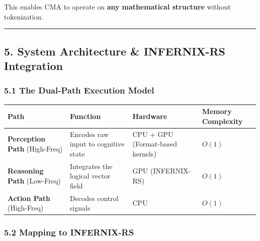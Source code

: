 \documentclass[
  11pt,
  a4paper,
]{article}
\begin{document}
This enables CMA to operate on \textbf{any mathematical structure}
without tokenization.

\begin{center}\rule{0.5\linewidth}{0.5pt}\end{center}

\subsection{5. System Architecture \& INFERNIX-RS
Integration}\label{system-architecture-infernix-rs-integration}

\subsubsection{5.1 The Dual-Path Execution
Model}\label{the-dual-path-execution-model}

\begin{longtable}[]{@{}
  >{\raggedright\arraybackslash}p{}
  >{\raggedright\arraybackslash}p{}
  >{\raggedright\arraybackslash}p{}
  >{\raggedright\arraybackslash}p{}@{}}
\toprule\noalign{}
\begin{minipage}[b]{\linewidth}\raggedright
Path
\end{minipage} & \begin{minipage}[b]{\linewidth}\raggedright
Function
\end{minipage} & \begin{minipage}[b]{\linewidth}\raggedright
Hardware
\end{minipage} & \begin{minipage}[b]{\linewidth}\raggedright
Memory Complexity
\end{minipage} \\
\midrule\noalign{}
\endhead
\bottomrule\noalign{}
\endlastfoot
\textbf{Perception Path} (High-Freq) & Encodes raw input to cognitive
state & CPU + GPU (Format-based kernels) & \(O(1)\) \\
\textbf{Reasoning Path} (Low-Freq) & Integrates the logical vector field
& GPU (INFERNIX-RS) & \(O(1)\) \\
\textbf{Action Path} (High-Freq) & Decodes control signals & CPU &
\(O(1)\) \\
\end{longtable}

\subsubsection{5.2 Mapping to INFERNIX-RS}\label{mapping-to-infernix-rs}
\end{document}
